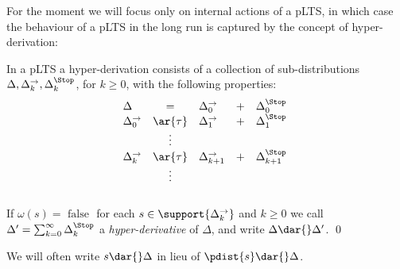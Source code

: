 \documentclass{LMCS}
\begin{document}
For the moment we will focus only on internal actions of 
a pLTS, in which case the behaviour of a pLTS in the long run is captured by the 
concept of hyper-derivation:
\begin{defi}
\label{def:hypder}
  In a  pLTS a hyper-derivation consists of a collection of sub-distributions
$\Delta, \Delta_k^{\rightarrow}, \Delta_k^{\Stop}$, for $k \geq 0$,
with the following properties:
$$
\begin{array}{lclcl}    \Delta &=& \Delta_0^{\rightarrow} &+& \Delta_0^\Stop    \notag\\
  \Delta_0^{\rightarrow}  &\ar{\tau}& \Delta_1^{\rightarrow} &+& \Delta_1^\Stop \notag \\
&\vdots \\
  \Delta_k^{\rightarrow}  &\ar{\tau}& \Delta_{k{+}1}^{\rightarrow} &+& \Delta_{k{+}1}^\Stop~ \notag \\
&\vdots    &   \notag  \\&&\notag\\
\end{array}
$$
 If $\omega(s) = \mbox{ false } $ for each  $s \in \support{\Delta_k^{\rightarrow}}$ and $ k \geq 0 $
we call $\Delta' = \sum_{k=0}^\infty \Delta_k^{\Stop}$ a
\emph{hyper-derivative} of $\Delta$, and write
$\Delta\dar{}  \Delta'$.
\qed
\end{defi}
\noindent
We will often write $s \dar{} \Delta$ in lieu of $\pdist{s} \dar{} \Delta$.
\end{document}
